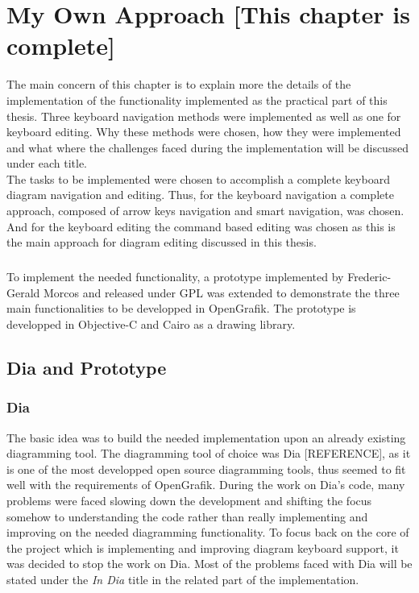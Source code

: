 \chapter{My Own Approach [This chapter is complete]}
\beginchapter
The main concern of this chapter is to explain more the details of the implementation of the functionality implemented as the practical part of this thesis. Three keyboard navigation methods were implemented as well as one for keyboard editing. Why these methods were chosen, how they were implemented and what where the challenges faced during the implementation will be discussed under each title.\\
The tasks to be implemented were chosen to accomplish a complete keyboard diagram navigation and editing. Thus, for the keyboard navigation a complete approach, composed of arrow keys navigation and smart navigation, was chosen. And for the keyboard editing the command based editing was chosen as this is the main approach for diagram editing discussed in this thesis.

\paragraph{}
To implement the needed functionality, a prototype implemented by Frederic-Gerald Morcos and released under GPL was extended to demonstrate the three main functionalities to be developped in OpenGrafik. The prototype is developped in Objective-C and Cairo as a drawing library.

\section{Dia and Prototype}
\subsection{Dia}
The basic idea was to build the needed implementation upon an already existing diagramming tool. The diagramming tool of choice was Dia [REFERENCE], as it is one of the most developped open source diagramming tools, thus seemed to fit well with the requirements of OpenGrafik. During the work on Dia's code, many problems were faced slowing down the development and shifting the focus somehow to understanding the code rather than really implementing and improving on the needed diagramming functionality. To focus back on the core of the project which is implementing and improving diagram keyboard support, it was decided to stop the work on Dia. Most of the problems faced with Dia will be stated under the {\it In Dia} title in the related part of the implementation.

